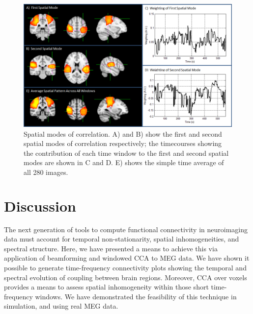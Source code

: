 \begin{figure}
	\includegraphics[width=\linewidth]{./images/chapter4/figure_9.png}\caption{Spatial modes of correlation. A) and B) show the first and second spatial modes of correlation respectively; the timecourses showing the contribution of each time window to the first and second spatial modes are shown in C and D. E) shows the simple time average of all 280 images.}\label{fig_4_9}
\end{figure}

\clearpage
\section{Discussion}\label{sec_cca_discuss}
The next generation of tools to compute functional connectivity in neuroimaging data must account for temporal non-stationarity, spatial inhomogeneities, and spectral structure. Here, we have presented a means to achieve this via application of beamforming and windowed CCA to MEG data. We have shown it possible to generate time-frequency connectivity plots showing the temporal and spectral evolution of coupling between brain regions. Moreover, CCA over voxels provides a means to assess spatial inhomogeneity within those short time-frequency windows. We have demonstrated the feasibility of this technique in simulation, and using real MEG data.

